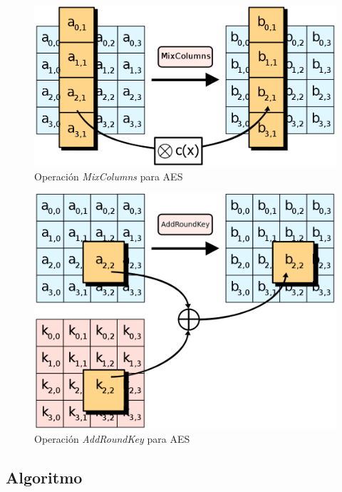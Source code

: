 \begin{figure}[ht]
  \centering
  \includegraphics[scale=0.25]{Figures/MixColumns}
  \decoRule
  \caption[\emph{MixColumns} (AES)]{Operación \emph{MixColumns} para AES \emph{\parencite{Reference29}}}
  \label{fig:MixColumns}
\end{figure}

\begin{figure}[ht]
  \centering
  \includegraphics[scale=0.4]{Figures/AddRoundKey}
  \decoRule
  \caption[\emph{AddRoundKey} (AES)]{Operación \emph{AddRoundKey} para AES \emph{\parencite{Reference30}}}
  \label{fig:AddRoundKey}
\end{figure}

\emph{\parencite{Reference26}}

\subsection{Algoritmo}

